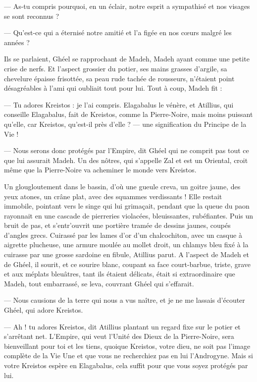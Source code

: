 \documentclass[a4paper, 11pt, oneside, polutonikogreek, french]{article}
\begin{document}
--- As-tu compris pourquoi, en un éclair, notre esprit a sympathisé et nos visages se sont reconnus ?

--- Qu'est-ce qui a éternisé notre amitié et l'a figée en nos cœurs malgré les années ?

Ils se parlaient, Ghéel se rapprochant de Madeh, Madeh ayant comme une petite crise de nerfs. Et l'aspect grossier du potier, ses mains grasses d'argile, sa chevelure épaisse frisottée, sa peau rude tachée de rousseurs, n'étaient point désagréables à l'ami qui oubliait tout pour lui. Tout à coup, Madeh fit :

--- Tu adores Kreistos : je l'ai compris. Elagabalus le vénère, et Atillius, qui conseille Elagabalus, fait de Kreistos, comme la Pierre-Noire, mais moins puissant qu'elle, car Kreistos, qu'est-il près d'elle ? --- une signification du Principe de la Vie !

--- Nous serons donc protégés par l'Empire, dit Ghéel qui ne comprit pas tout ce que lui assurait Madeh. Un des nôtres, qui s'appelle Zal et est un Oriental, croit même que la Pierre-Noire va acheminer le monde vers Kreistos.

Un glougloutement dans le bassin, d'où une gueule creva, un goitre jaune, des yeux atones, un crâne plat, avec des squammes verdissants ! Elle restait immobile, pointant vers le singe qui lui grimaçait, pendant que la queue du paon rayonnait en une cascade de pierreries violacées, bleuissantes, rubéfiantes. Puis un bruit de pas, et s'entr'ouvrit une portière tramée de dessins jaunes, coupés d'angles grecs. Cuirassé par les lames d'or d'un chalcochiton, avec un casque à aigrette plucheuse, une armure moulée au mollet droit, un chlamys bleu fixé à la cuirasse par une grosse sardoine en fibule, Atillius parut. A l'aspect de Madeh et de Ghéel, il sourit, et ce sourire blanc, coupant sa face court-barbue, triste, grave et aux méplats bleuâtres, tant ils étaient délicats, était si extraordinaire que Madeh, tout embarrassé, se leva, couvrant Ghéel qui s'effarait.

--- Nous causions de la terre qui nous a vus naître, et je ne me lassais d'écouter Ghéel, qui adore Kreistos.

--- Ah ! tu adores Kreistos, dit Atillius plantant un regard fixe sur le potier et s'arrêtant net. L'Empire, qui veut l'Unité des Dieux de la Pierre-Noire, sera bienveillant pour toi et les tiens, quoique Kreistos, votre dieu, ne soit pas l'image complète de la Vie Une et que vous ne recherchiez pas en lui l'Androgyne. Mais si votre Kreistos espère en Elagabalus, cela suffit pour que vous soyez protégés par lui.
\end{document}
